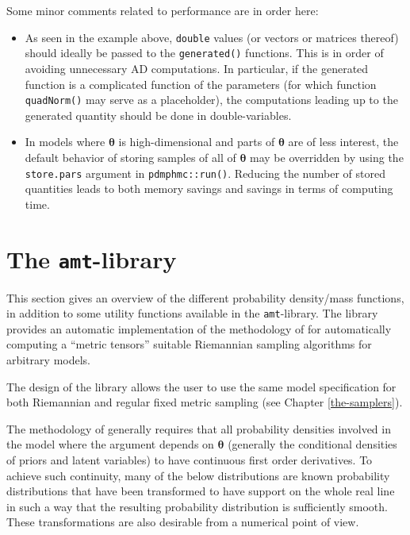 \documentclass[
]{book}
\begin{document}
Some minor comments related to performance are in order here:

\begin{itemize}
\item
  As seen in the example above, \texttt{double} values (or vectors or matrices thereof) should ideally be passed to the \texttt{generated()} functions. This is in order of avoiding unnecessary AD computations. In particular, if the generated function is a complicated function of the parameters (for which function \texttt{quadNorm()} may serve as a placeholder), the computations leading up to the generated quantity should be done in double-variables.
\item
  In models where \(\boldsymbol \theta\) is high-dimensional and parts of \(\boldsymbol \theta\) are of less interest, the default behavior of storing samples of all of \(\boldsymbol \theta\) may be overridden by using the \texttt{store.pars} argument in \texttt{pdmphmc::run()}. Reducing the number of stored quantities leads to both memory savings and savings in terms of computing time.
\end{itemize}

\hypertarget{amt-lib}{%
\chapter{\texorpdfstring{The \texttt{amt}-library}{The amt-library}}\label{amt-lib}}

This section gives an overview of the different probability density/mass functions, in addition to some utility functions available in the \texttt{amt}-library. The library provides an automatic
implementation of the methodology of \citet{kleppe_amt} for automatically computing a ``metric tensors'' suitable Riemannian sampling algorithms for arbitrary models.

The design of the library allows the user to use the same model specification for both Riemannian and regular fixed metric sampling (see Chapter \ref{the-samplers}).

The methodology of \citet{kleppe_amt} generally requires that all probability densities involved in the model where the argument depends on \(\boldsymbol \theta\) (generally the conditional densities of priors and latent variables) to have continuous first order derivatives. To achieve such continuity, many of the below distributions are known probability distributions that have been transformed to have support on the whole real line in such a way that the resulting probability distribution is sufficiently smooth. These transformations are also desirable from a numerical point of view.
\end{document}
